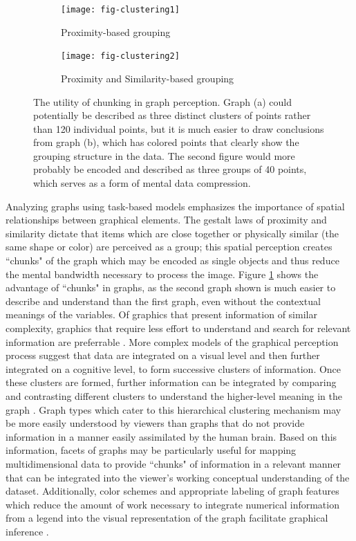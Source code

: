\documentclass[11pt]{isuthesis}\usepackage[]{graphicx}\usepackage[]{color}
\begin{document}
\begin{figure}[htbp]\centering
\begin{subfigure}[b]{.45\textwidth}\centering
  \texttt{[image: fig-clustering1]}
  \caption{Proximity-based grouping}
\end{subfigure}\hfill
\begin{subfigure}[b]{.45\textwidth}\centering
  \texttt{[image: fig-clustering2]}
  \caption{Proximity and Similarity-based grouping}
\end{subfigure}\hfill
\caption[Chunking in Graphs]{The utility of chunking in graph perception. Graph (a) could potentially be described as three distinct clusters of points rather than 120 individual points, but it is much easier to draw conclusions from graph (b), which has colored points that clearly show the grouping structure in the data. The second figure would more probably be encoded and described as three groups of 40 points, which serves as a form of mental data compression.}\label{fig:clustering}
\end{figure}

Analyzing graphs using task-based models emphasizes the importance of spatial relationships between graphical elements. The gestalt laws of proximity and similarity dictate that items which are close together or physically similar (the same shape or color) are perceived as a group; this spatial perception creates ``chunks" of the graph which may be encoded as single objects and thus reduce the mental bandwidth necessary to process the image. Figure \ref{fig:clustering} shows the advantage of ``chunks" in graphs, as the second graph shown is much easier to describe and understand than the first graph, even without the contextual meanings of the variables. Of graphics that present information of similar complexity, graphics that require less effort to understand and search for relevant information are preferrable \citep{cleveland:1985}. More complex models of the graphical perception process suggest that data are integrated on a visual level and then further integrated on a cognitive level, to form successive clusters of information. Once these clusters are formed, further information can be integrated by comparing and contrasting different clusters to understand the higher-level meaning in the graph \citep{ratwani2008thinking}. Graph types which cater to this hierarchical clustering mechanism may be more easily understood by viewers than graphs that do not provide information in a manner easily assimilated by the human brain. Based on this information, facets of graphs may be particularly useful for mapping multidimensional data to provide ``chunks" of information in a relevant manner that can be integrated into the viewer's working conceptual understanding of the dataset. Additionally, color schemes and appropriate labeling of graph features which reduce the amount of work necessary to integrate numerical information from a legend into the visual representation of the graph facilitate graphical inference \citep{carpenter1998model}.
\end{document}
